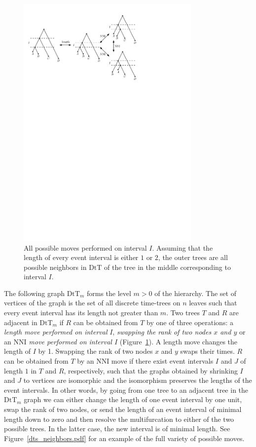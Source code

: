 \documentclass[11pt]{amsart}
\theoremstyle{definition}
\newcommand{\nni}{\mathrm{NNI}}
\newcommand{\dtt}{\mathrm{DtT}}
\begin{document}
\begin{figure}[ht]
\centering
\includegraphics[width=0.8\textwidth]{DtT.pdf}
\caption{All possible moves performed on interval $I$.
Assuming that the length of every event interval is either $1$ or $2$, the outer trees are all possible neighbors in $\dtt$ of the tree in the middle corresponding to interval $I$.}
\label{DtT.pdf}
\end{figure}

The following graph $\dtt_m$ forms the level $m > 0$ of the hierarchy.
The set of vertices of the graph is the set of all discrete time-trees on $n$ leaves such that every event interval has its length not greater than $m$.
Two trees $T$ and $R$ are adjacent in $\dtt_m$ if $R$ can be obtained from $T$ by one of three operations: a \emph{length move performed on interval} $I$, \emph{swapping the rank of two nodes $x$ and $y$} or an \emph{$\nni$ move performed on interval $I$} (Figure~\ref{DtT.pdf}).
A length move changes the length of $I$ by 1.
Swapping the rank of two nodes $x$ and $y$ swaps their times.
$R$ can be obtained from $T$ by an $\nni$ move if there exist event intervals $I$ and $J$ of length $1$ in $T$ and $R$, respectively, such that the graphs obtained by shrinking $I$ and $J$ to vertices are isomorphic and the isomorphism preserves the lengths of the event intervals.
In other words, by going from one tree to an adjacent tree in the $\dtt_m$ graph we can either change the length of one event interval by one unit, swap the rank of two nodes, or send the length of an event interval of minimal length down to zero and then resolve the multifurcation to either of the two possible trees.
In the latter case, the new interval is of minimal length.
See Figure~\ref{dts_neighbors.pdf} for an example of the full variety of possible moves.
\end{document}
